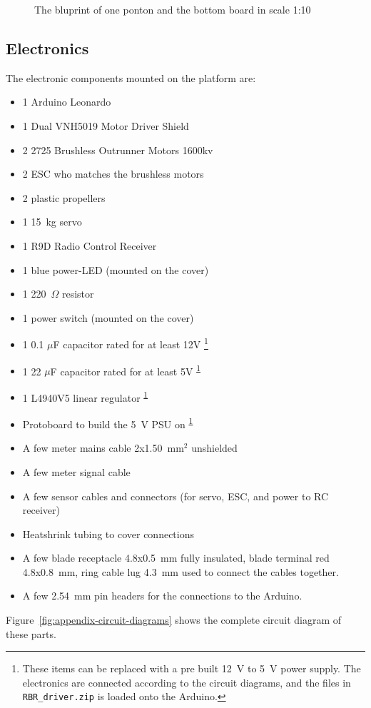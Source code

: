   \begin{figure}
    \centering


    \caption{The bluprint of one ponton and the bottom board in scale 1:10}
    \label{fig:appendix-blueprint-ponton}
\end{figure}
\subsection{Electronics}

The electronic components mounted on the platform are:

\begin{itemize}
  \item 1 Arduino Leonardo
  \item 1 Dual VNH5019 Motor Driver Shield
  \item 2 2725 Brushless Outrunner Motors 1600kv
  \item 2 ESC who matches the brushless motors
  \item 2 plastic propellers
  \item 1 15~kg servo
  \item 1 R9D Radio Control Receiver
  \item 1 blue power-LED (mounted on the cover)
  \item 1 220~$\Omega$ resistor
  \item 1 power switch (mounted on the cover)
  \item 1 0.1 $\mu$F capacitor rated for at least 12V \footnote{\label{fotnot_app} These items can be replaced with a pre built 12~V to 5~V power supply. The electronics are connected according to the circuit diagrams, and the files in \texttt{RBR\_driver.zip} is loaded onto the Arduino.} %
  \item 1 22 $\mu$F capacitor rated for at least 5V \textsuperscript{\ref{fotnot_app}}
  \item 1 L4940V5 linear regulator \textsuperscript{\ref{fotnot_app}}%
  \item Protoboard to build the 5~V PSU on \textsuperscript{\ref{fotnot_app}} 
  \item A few meter mains cable 2x1.50~mm$^2$ unshielded
  \item A few meter signal cable
  \item A few sensor cables and connectors (for servo, ESC, and power to RC receiver)
  \item Heatshrink tubing to cover connections
  \item A few blade receptacle 4.8x0.5~mm fully insulated, blade terminal red
    4.8x0.8~mm, ring cable lug 4.3~mm used to connect the cables together.
  \item A few 2.54~mm pin headers for the connections to the Arduino.
\end{itemize}
 Figure~\ref{fig:appendix-circuit-diagrams} shows the complete circuit diagram of these parts.

